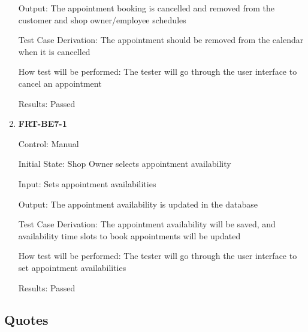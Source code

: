 \documentclass[12pt, titlepage]{article}
\begin{document}
\begin{enumerate}
	      Output: The appointment booking is cancelled and removed from the customer and shop owner/employee
	      schedules

	      Test Case Derivation: The appointment should be removed from the calendar when it is cancelled

	      How test will be performed: The tester will go through the user interface to cancel an appointment

	      Results: Passed

	\item \textbf{FRT-BE7-1}

	      Control: Manual

	      Initial State: Shop Owner selects appointment availability

	      Input: Sets appointment availabilities

	      Output: The appointment availability is updated in the database

	      Test Case Derivation: The appointment availability will be saved, and availability time slots to
	      book appointments will be updated

	      How test will be performed: The tester will go through the user interface to set appointment
	      availabilities

	      Results: Passed

\end{enumerate}

\subsection{Quotes}
\end{document}
